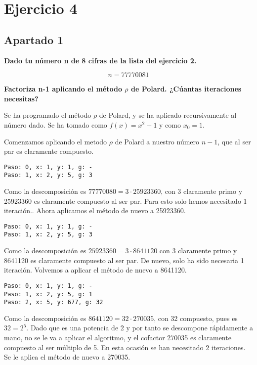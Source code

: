 \documentclass[a4paper]{article}
\title {\fbox{\Huge{\textbf{Ejercicio 4}}}}
\author {\fbox{Ana Buendía Ruiz-Azuaga}}
\begin{document}
\maketitle


\section{Ejercicio 4}
\subsection{Apartado 1}
\textbf{Dado tu número n de 8 cifras de la lista del ejercicio 2.}

$$n = 77770081$$

\textbf{Factoriza n-1 aplicando el método $\rho$ de Polard. ¿Cúantas iteraciones necesitas?}

Se ha programado el método $\rho$ de Polard, y se ha aplicado recursivamente al número dado. Se ha tomado como $f(x)=x^2+1$ y como $x_0=1$.

Comenzamos aplicando el metodo $\rho$ de Polard a nuestro número $n-1$, que al ser par es claramente compuesto.

\begin{verbatim}
Paso: 0, x: 1, y: 1, g: -
Paso: 1, x: 2, y: 5, g: 3
\end{verbatim}

Como la descomposición es $77770080=3\cdot 25923360$, con 3 claramente primo y 25923360 es claramente compuesto al ser par. Para esto solo hemos necesitado 1 iteración.. Ahora aplicamos el método de nuevo a 25923360.

\begin{verbatim}
Paso: 0, x: 1, y: 1, g: -
Paso: 1, x: 2, y: 5, g: 3
\end{verbatim}

Como la descomposición es $25923360=3\cdot 8641120$ con 3 claramente primo y 8641120 es claramente compuesto al ser par. De nuevo, solo ha sido necesaria 1 iteración. Volvemos a aplicar el método de nuevo a 8641120.

\begin{verbatim}
Paso: 0, x: 1, y: 1, g: -
Paso: 1, x: 2, y: 5, g: 1
Paso: 2, x: 5, y: 677, g: 32
\end{verbatim}

Como la descomposición es $8641120=32\cdot 270035$, con 32 compuesto, pues es $32=2^5$. Dado que es una potencia de 2 y por tanto se descompone rápidamente a mano, no se le va a aplicar el algoritmo, y el cofactor 270035 es claramente compuesto al ser múltiplo de 5. En esta ocasión se han necesitado 2 iteraciones. Se le aplica el método de nuevo a 270035. 
\end{document}
